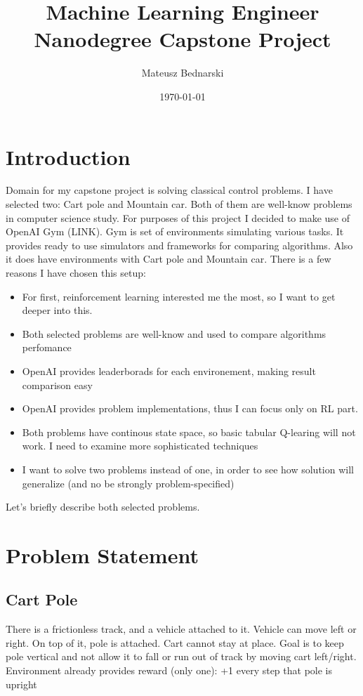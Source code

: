 \documentclass[12pt]{article}
\title{Machine Learning Engineer Nanodegree Capstone Project}
\author{Mateusz Bednarski}
\date{\today}
\begin{document}
\maketitle



\section{Introduction}

Domain for my capstone project is solving classical control problems. I have selected two: Cart pole and Mountain car. Both of them are well-know problems in computer science study. For purposes of this project I decided to make use of OpenAI Gym (LINK). Gym is set of environments simulating various tasks. It provides ready to use simulators and frameworks for comparing algorithms. Also it does have environments with Cart pole and Mountain car. There is a few reasons I have chosen this setup:

\begin{itemize}
\item For first, reinforcement learning interested me the most, so I want to get deeper into this.

\item Both selected problems are well-know and used to compare algorithms perfomance
\item OpenAI provides leaderborads for each environement, making result comparison easy
\item 
OpenAI provides problem implementations, thus I can focus only on RL part.
\item Both problems have continous state space, so basic tabular Q-learing will not work. I need to examine more sophisticated techniques
\item I want to solve two problems instead of one, in order to see how solution will generalize (and no be strongly problem-specified)
\end{itemize}


Let's briefly describe both selected problems.

\section{Problem Statement}
\subsection{Cart Pole}

There is a frictionless track, and a vehicle attached to it. Vehicle can move left or right. On top of it, pole is attached. Cart cannot stay at place. Goal is to keep pole vertical and not allow it to fall or run out of track by moving cart left/right. Environment already provides reward (only one): +1 every step that pole is upright
\end{document}
